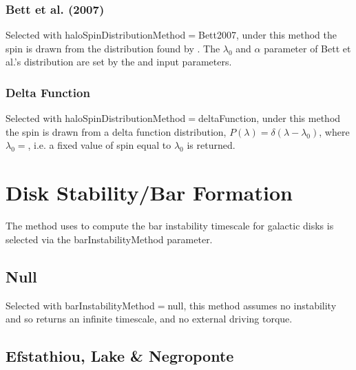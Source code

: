 \subsubsection{Bett et al. (2007)}

Selected with {\normalfont \ttfamily haloSpinDistributionMethod}$=${\normalfont \ttfamily Bett2007}, under this method the spin is drawn from the distribution found by \cite{bett_spin_2007}. The $\lambda_0$ and $\alpha$ parameter of Bett et al.'s distribution are set by the {\normalfont {}} and {\normalfont {}} input parameters.

\subsubsection{Delta Function}

Selected with {\normalfont \ttfamily haloSpinDistributionMethod}$=${\normalfont \ttfamily deltaFunction}, under this method the spin is drawn from a delta function distribution, $P(\lambda) = \delta(\lambda-\lambda_0)$, where $\lambda_0=${\normalfont \ttfamily [deltaFunctionSpinDistributionSpin]}, i.e. a fixed value of spin equal to $\lambda_0$ is returned.

\section{Disk Stability/Bar Formation}\label{sec:DiskStability}

The method uses to compute the bar instability timescale for galactic disks is selected via the {\normalfont \ttfamily barInstabilityMethod} parameter.

\subsection{Null}

Selected with {\normalfont \ttfamily barInstabilityMethod}$=${\normalfont \ttfamily null}, this method assumes no instability and so returns an infinite timescale, and no external driving torque.

\subsection{Efstathiou, Lake \& Negroponte}

